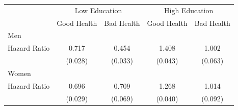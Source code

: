 \begin{tabular}{lcccc}
    \toprule
     & \multicolumn{2}{c}{Low Education} & \multicolumn{2}{c}{High Education} \\
     & Good Health & Bad Health & Good Health & Bad Health \\
    \midrule
    Men & & & & \\
    \midrule
    Hazard Ratio & 0.717 & 0.454 & 1.408 & 1.002 \\
     & (0.028) & (0.033) & (0.043) & (0.063) \\
    \midrule
    Women & & & & \\
    \midrule
    Hazard Ratio & 0.696 & 0.709 & 1.268 & 1.014 \\
     & (0.029) & (0.069) & (0.040) & (0.092) \\
    \bottomrule
\end{tabular}
